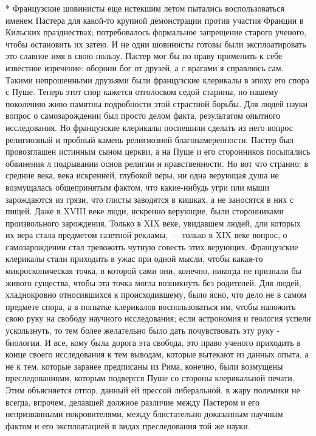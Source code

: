 * Французские  шовинисты еще  истекшим летом  пытались воспользоваться
именем  Пастера  для  какой-то  крупной  демонстрации  против  участия
Франции в  Кильских празднествах; потребовалось  формальное запрещение
старого ученого, чтобы остановить их затею. И не одни шовинисты готовы
были эксплоатировать это  славное имя в свою пользу. Пастер  мог бы по
праву применить к себе известное изречение: оборони бог от друзей, а с
врагами я справлюсь сам. Такими непрошенными друзьями были французские
клерикалы  в  эпоху  его  спора  с  Пуше.  Теперь  этот  спор  кажется
отголоском седой старины, но нашему поколению живо памятны подробности
этой страстной  борьбы. Для  людей науки  вопрос о  самозарождении был
просто делом факта, результатом  опытного исследования. Но французские
клерикалы  поспешили  сделать из  него  вопрос  религиозный и  пробный
камень религиозной благонамеренности. Пастер был провозглашен истинным
сыном  церкви, а  на Пуше  и  его сторонников  посыпались обвинения  л
подрывании  основ религии  и  нравственности. Но  вот  что странно:  в
средние века, века искренней, глубокой  веры, ни одна верующая душа не
возмущалась  общепринятым  фактом,  что  какие-нибудь  угри  или  мыши
зарождаются из грязи, что глисты заводятся  в кишках, а не заносятся в
них  с  пищей.  Даже  в  XVIII  веке  люди,  искренно  верующие,  были
сторонниками произвольного  зарождения. Только  в XIX  веке, увидавшем
людей,  дли которых  их  вера стала  предметом  газетной рекламы,  ---
только  в XIX  веке  вопрос, о  самозарождении  стал тревожить  чутную
совесть этих  верующих. Французские  клерикалы стали приходить  в ужас
при одной мысли, чтобы какая-то микроскопическая точка, в которой сами
они, конечно, никогда не признали  бы живого существа, чтобы эта точка
могла возникнуть без родителей. Для людей, хладнокровно относившихся к
происходившему, было  ясно, что дело  не в  самом предмете спора,  а в
попытке  клерикалов воспользоваться  им, чтобы  наложить свою  руку на
свободу  научного  исследования;  если астрономия  и  геология  успели
ускользнуть, то тем более желательно  было дать почувствовать эту руку
- биологии.  И все, кому  была дорога  эта свобода, это  право ученого
приходить в конце своего исследования  к тем выводам, которые вытекают
из  данных опыта,  а не  к тем,  которые заранее  предписаны из  Рима,
конечно,  были возмущены  преследованиями, которым  подвергся Пуше  со
стороны клерикальной печати. Этим объясняется отпор, данный ей прессой
либеральной,  в жару  полемики  не всегда,  впрочем, делавшей  должное
различие  между  Пастером  и его  непризванными  покровителями,  между
блистательно  доказанным научным  фактом и  его эксплоатацией  в видах
преследования той же науки.

